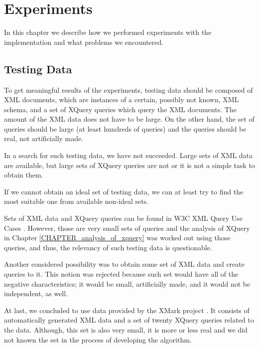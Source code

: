 \chapter{Experiments}
In this chapter we describe how we performed experiments with the implementation and what problems we encountered.

\section{Testing Data}
To get meaningful results of the experiments, testing data should be composed of XML documents, which are instances of a certain, possibly not known, XML schema, and a set of XQuery queries which query the XML documents. The amount of the XML data does not have to be large. On the other hand, the set of queries should be large (at least hundreds of queries) and the queries should be real, not artificially made.

In a search for such testing data, we have not succeeded. Large sets of XML data are available, but large sets of XQuery queries are not or it is not a simple task to obtain them.

If we cannot obtain an ideal set of testing data, we can at least try to find the most suitable one from available non-ideal sets.

Sets of XML data and XQuery queries can be found in W3C XML Query Use Cases \cite{Marchiori:07:XQU}. However, those are very small sets of queries and the analysis of XQuery in Chapter \ref{CHAPTER_analysis_of_xquery} was worked out using those queries, and thus, the relevancy of such testing data is questionable.

Another considered possibility was to obtain some set of XML data and create queries to it. This notion was rejected because such set would have all of the negative characteristics; it would be small, artificially made, and it would not be independent, as well.

At last, we concluded to use data provided by the XMark project \cite{xmark}. It consists of automatically generated XML data and a set of twenty XQuery queries related to the data. Although, this set is also very small, it is more or less real and we did not known the set in the process of developing the algorithm.